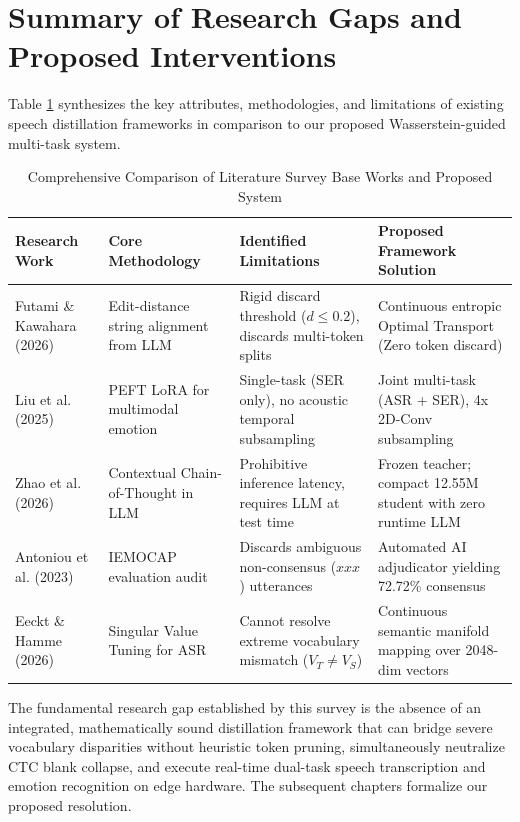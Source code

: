 \section{Summary of Research Gaps and Proposed Interventions}
Table \ref{tab:lit_comparison} synthesizes the key attributes, methodologies, and limitations of existing speech distillation frameworks in comparison to our proposed Wasserstein-guided multi-task system.

\begin{table}[htbp]
\centering
\caption{Comprehensive Comparison of Literature Survey Base Works and Proposed System}
\label{tab:lit_comparison}
\small
\begin{tabular}{p{3.2cm}p{3.0cm}p{4.2cm}p{3.6cm}}
\toprule
\textbf{Research Work} & \textbf{Core Methodology} & \textbf{Identified Limitations} & \textbf{Proposed Framework Solution} \\
\midrule
Futami \& Kawahara (2026) \cite{futami2026distilling} & Edit-distance string alignment from LLM & Rigid discard threshold ($d \le 0.2$), discards multi-token splits & Continuous entropic Optimal Transport (Zero token discard) \\
\addlinespace
Liu et al. (2025) \cite{liu2025reward} & PEFT LoRA for multimodal emotion & Single-task (SER only), no acoustic temporal subsampling & Joint multi-task (ASR + SER), 4x 2D-Conv subsampling \\
\addlinespace
Zhao et al. (2026) \cite{zhao2026steering} & Contextual Chain-of-Thought in LLM & Prohibitive inference latency, requires LLM at test time & Frozen teacher; compact 12.55M student with zero runtime LLM \\
\addlinespace
Antoniou et al. (2023) \cite{antoniou2023designing} & IEMOCAP evaluation audit & Discards ambiguous non-consensus ($xxx$) utterances & Automated AI adjudicator yielding 72.72\% consensus \\
\addlinespace
Eeckt \& Hamme (2026) \cite{eeckt2026efficient} & Singular Value Tuning for ASR & Cannot resolve extreme vocabulary mismatch ($V_T \ne V_S$) & Continuous semantic manifold mapping over 2048-dim vectors \\
\bottomrule
\end{tabular}
\end{table}

The fundamental research gap established by this survey is the absence of an integrated, mathematically sound distillation framework that can bridge severe vocabulary disparities without heuristic token pruning, simultaneously neutralize CTC blank collapse, and execute real-time dual-task speech transcription and emotion recognition on edge hardware. The subsequent chapters formalize our proposed resolution.
